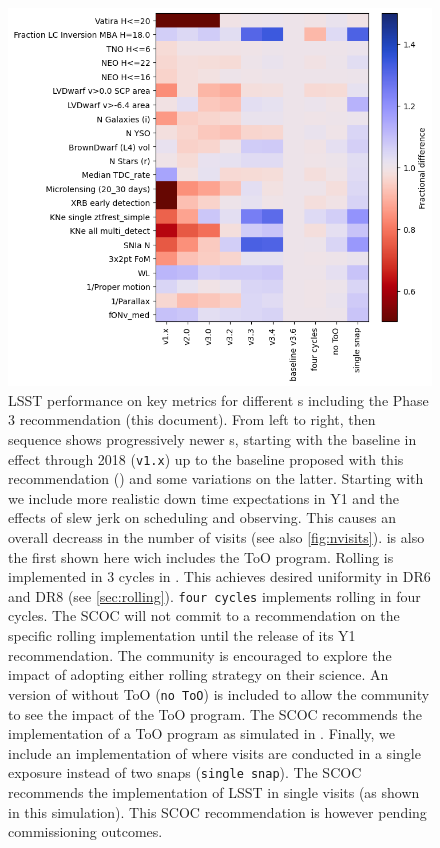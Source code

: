 {\begin{figure}
    \centering
    \includegraphics[width=0.9\linewidth]{figures/scoc_heatmap.png}
    \caption{LSST performance on key metrics for different \opsim s including the Phase 3 recommendation (this document). From left to right, then sequence shows progressively newer \opsim s, starting with the baseline in effect through 2018 (\texttt{v1.x}) up to the baseline proposed with this recommendation () and some variations on the latter. Starting with  we include more realistic down time expectations in Y1 and the effects of slew jerk on scheduling and observing. This causes an overall decreass in the number of visits (see also \autoref{fig:nvisits}).  is also the first \opsim  shown here wich includes the ToO program. Rolling is implemented in 3 cycles in . This achieves desired uniformity in DR6 and DR8 (see \autoref{sec:rolling}). \texttt{four cycles} implements rolling in four cycles. The SCOC will not commit to a recommendation on the specific rolling implementation until the release of its Y1 recommendation. The community is encouraged to explore the impact of adopting either rolling strategy on their science. An version of  without ToO (\texttt{no ToO}) is included to allow the community to see the impact of the ToO program. The SCOC recommends the implementation of a ToO program as simulated in . Finally, we include an implementation of  where visits are conducted in a single exposure instead of two snaps (\texttt{single snap}). The SCOC recommends the implementation of LSST in single visits (as shown in this simulation). This SCOC recommendation is however pending commissioning outcomes.}
    \label{fig:summary}
\end{figure}

}
